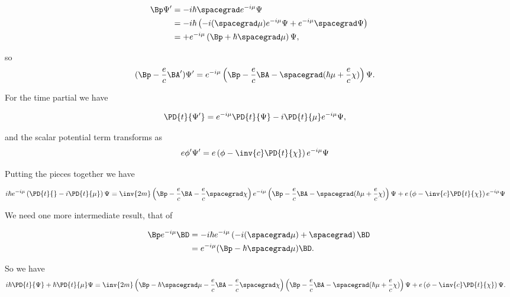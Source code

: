 \begin{align*}
\Bp \Psi' 
&=
-i \hbar \spacegrad e^{-i \mu} \Psi \\
&=
-i \hbar \left( 
-i (\spacegrad \mu) e^{-i \mu} \Psi 
+ e^{-i \mu} \spacegrad \Psi  
\right) \\
&=
+ e^{-i \mu} \left( \Bp + \hbar \spacegrad \mu \right) \Psi,
\end{align*}

so
\begin{align*}
(\Bp -\frac{e}{c} \BA' )\Psi' 
&=
e^{-i \mu} \left( \Bp - \frac{e}{c} \BA - \spacegrad (\hbar \mu + \frac{e}{c} \chi) \right) \Psi.
\end{align*}

For the time partial we have

\begin{align*}
\PD{t}{\Psi'} &= e^{-i \mu} \PD{t}{\Psi} -i \PD{t}{\mu} e^{-i \mu} \Psi,
\end{align*}

and the scalar potential term transforms as
\begin{align*}
e \phi' \Psi'
&=
e \left( \phi - \inv{c} \PD{t}{\chi} \right) e^{-i \mu } \Psi
\end{align*}

Putting the pieces together we have

\begin{align*}
i \hbar e^{-i \mu}
\left( \PD{t}{} -i \PD{t}{\mu} \right) \Psi 
&=
\inv{2m}
\left(\Bp -\frac{e}{c} \BA -\frac{e}{c} \spacegrad \chi \right)
e^{-i \mu} \left( \Bp - \frac{e}{c} \BA - \spacegrad (\hbar \mu + \frac{e}{c} \chi) \right) \Psi 
+ e \left( \phi - \inv{c} \PD{t}{\chi} \right) e^{-i \mu } \Psi
\end{align*}

We need one more intermediate result, that of

\begin{align*}
\Bp e^{-i \mu } \BD
&= 
- i \hbar e^{-i \mu} \left( -i (\spacegrad \mu) + \spacegrad \right) \BD \\
&= 
e^{-i\mu} (\Bp - \hbar \spacegrad \mu) \BD.
\end{align*}

So we have
\begin{align*}
i \hbar \PD{t}{\Psi}
+\hbar \PD{t}{\mu} \Psi 
&=
\inv{2m}
\left(\Bp - \hbar \spacegrad \mu -\frac{e}{c} \BA -\frac{e}{c} \spacegrad \chi \right)
\left( \Bp - \frac{e}{c} \BA - \spacegrad (\hbar \mu + \frac{e}{c} \chi) \right) \Psi 
+ e \left( \phi - \inv{c} \PD{t}{\chi} \right) \Psi.
\end{align*}

